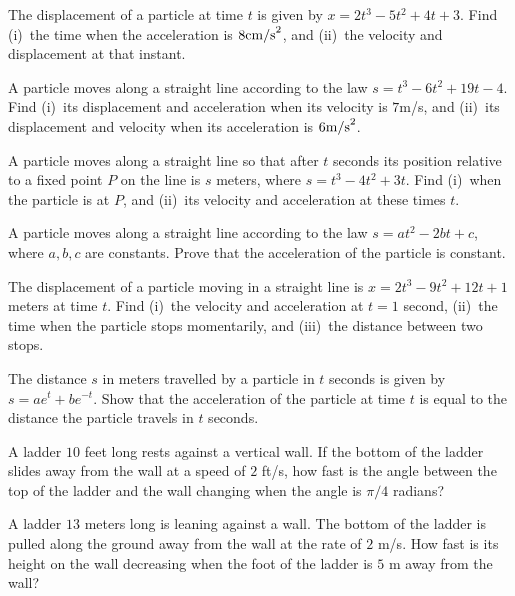 \begin{multicols}{2}
  \problem The displacement of a particle at time $t$ is given by
  $x=2t^3-5t^2+4t+3$.  Find (i)~the time when the acceleration is $8{\rm
  cm/s}^2$, and (ii)~the velocity and displacement at that instant.




  \problem A particle moves along a straight line according to the law
  $s=t^3-6t^2+19t-4$.  Find (i)~its displacement and acceleration when its
  velocity is $7$m/s, and (ii)~its displacement and velocity when its
  acceleration is $6{\rm m/s}^2$.




  \problem A particle moves along a straight line so that after $t$ seconds
  its position relative to a fixed point $P$ on the line is $s$ meters, where
  $s=t^3-4t^2+3t$.  Find (i)~when the particle is at $P$, and (ii)~its
  velocity and acceleration at these times $t$.




  \problem A particle moves along a straight line according to the law
  $s=at^2-2bt+c$, where $a,b,c$ are constants.  Prove that the acceleration
  of the particle is constant.




  \problem The displacement of a particle moving in a straight line is
  $x=2t^3-9t^2+12t+1$ meters at time $t$.  Find (i)~the velocity and
  acceleration at $t=1$ second, (ii)~the time when the particle stops
  momentarily, and (iii)~the distance between two stops.




  \problem The distance $s$ in meters travelled by a particle in $t$ seconds
  is given by $s=ae^t+be^{-t}$.  Show that the acceleration of the particle
  at time $t$ is equal to the distance the particle travels in $t$ seconds.



  \problem A ladder $10$ feet long rests against a vertical wall.  If the
  bottom of the ladder slides away from the wall at a speed of $2$ ft/s, how
  fast is the angle between the top of the ladder and the wall changing when
  the angle is $\pi/4$ radians?




  \problem A ladder $13$ meters long is leaning against a wall.  The bottom
  of the ladder is pulled along the ground away from the wall at the rate of
  $2$ m/s.  How fast is its height on the wall decreasing when the foot of
  the ladder is $5$ m away from the wall?





\end{multicols}
